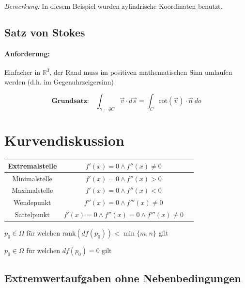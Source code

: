 \documentclass[11pt]{article}
\begin{document}
\emph{Bemerkung:} In diesem Beispiel wurden zylindrische Koordinaten benutzt.

\subsection{Satz von Stokes}

\paragraph{Anforderung:} Einfacher in $\mathbb{R}^3$, der Rand muss im positiven mathematischen Sinn umlaufen werden (d.h. im Gegenuhrzeigersinn)

\begin{equation*}
	\textbf{Grundsatz:}\quad\int_{\gamma = \partial C} \vec{v} \cdot d\vec{s} = \int_C \text{rot}(\vec{v}) \cdot \vec{n}\ do
\end{equation*}

\section{Kurvendiskussion}

\begin{table}[H]
\centering
\begin{tabular}{|c|c|c|}
\hline
Extremalstelle & $f'(x) =  0 \land f''(x) \neq 0$ \\ \hline
Minimalstelle & $f'(x) = 0 \land f''(x) > 0$ \\ \hline
Maximalstelle & $f'(x) = 0 \land f''(x) < 0$ \\ \hline
Wendepunkt & $f''(x) = 0 \land f'''(x) \neq 0$ \\ \hline
Sattelpunkt & $f'(x) = 0 \land f''(x) = 0 \land f'''(x) \neq 0$ \\ \hline
\end{tabular}
\end{table}

\begin{description}[labelindent=16pt,style=multiline,leftmargin=6cm, noitemsep]
	\item[kritischer Punkt:] $p_0 \in \Omega$ f{\"u}r welchen $\text{rank}(df(p_0)) < \min\{m,n\}$ gilt
	\item[Kandidaten f{\"u}r Extrema:] $p_0 \in \Omega$ f{\"u}r welchen $df(p_0) = 0$ gilt
\end{description}

\subsection{Extremwertaufgaben ohne Nebenbedingungen}
\end{document}
